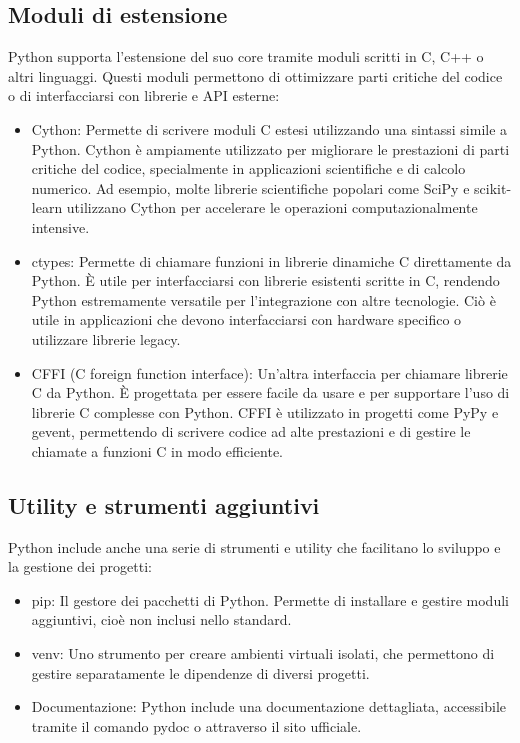\documentclass[
  letterpaper,
]{scrbook}
\providecommand{\tightlist}{%
  \setlength{\itemsep}{0pt}\setlength{\parskip}{0pt}}\usepackage{longtable,booktabs,array}
\begin{document}
\subsection{Moduli di estensione}\label{moduli-di-estensione}

Python supporta l'estensione del suo core tramite moduli scritti in C,
C++ o altri linguaggi. Questi moduli permettono di ottimizzare parti
critiche del codice o di interfacciarsi con librerie e API esterne:

\begin{itemize}
\tightlist
\item
  Cython: Permette di scrivere moduli C estesi utilizzando una sintassi
  simile a Python. Cython è ampiamente utilizzato per migliorare le
  prestazioni di parti critiche del codice, specialmente in applicazioni
  scientifiche e di calcolo numerico. Ad esempio, molte librerie
  scientifiche popolari come SciPy e scikit-learn utilizzano Cython per
  accelerare le operazioni computazionalmente intensive.
\item
  ctypes: Permette di chiamare funzioni in librerie dinamiche C
  direttamente da Python. È utile per interfacciarsi con librerie
  esistenti scritte in C, rendendo Python estremamente versatile per
  l'integrazione con altre tecnologie. Ciò è utile in applicazioni che
  devono interfacciarsi con hardware specifico o utilizzare librerie
  legacy.
\item
  CFFI (C foreign function interface): Un'altra interfaccia per chiamare
  librerie C da Python. È progettata per essere facile da usare e per
  supportare l'uso di librerie C complesse con Python. CFFI è utilizzato
  in progetti come PyPy e gevent, permettendo di scrivere codice ad alte
  prestazioni e di gestire le chiamate a funzioni C in modo efficiente.
\end{itemize}

\subsection{Utility e strumenti
aggiuntivi}\label{utility-e-strumenti-aggiuntivi}

Python include anche una serie di strumenti e utility che facilitano lo
sviluppo e la gestione dei progetti:

\begin{itemize}
\tightlist
\item
  pip: Il gestore dei pacchetti di Python. Permette di installare e
  gestire moduli aggiuntivi, cioè non inclusi nello standard.
\item
  venv: Uno strumento per creare ambienti virtuali isolati, che
  permettono di gestire separatamente le dipendenze di diversi progetti.
\item
  Documentazione: Python include una documentazione dettagliata,
  accessibile tramite il comando pydoc o attraverso il sito ufficiale.
\end{itemize}
\end{document}
